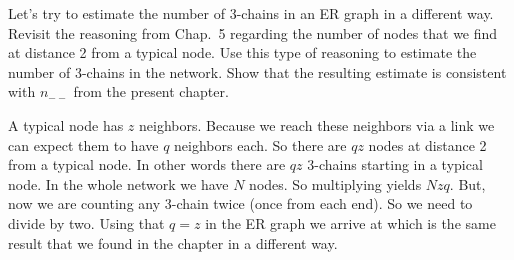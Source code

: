Let's try to estimate the number of 3-chains in an ER graph in a different way. Revisit the reasoning from Chap.~5 regarding the number of nodes that we find at distance 2 from a typical node. 
Use this type of reasoning to estimate the number of 3-chains in the network. Show that the resulting estimate is consistent with $n_{--}$ from the present chapter.   

\solution
A typical node has $z$ neighbors. Because we reach these neighbors via a link we can expect them to have $q$ neighbors each. So there are $qz$ nodes at distance 2 from a typical node. In other words there are $qz$ 3-chains starting in a typical node. In the whole network we have $N$ nodes. So multiplying yields $Nzq$. But, now we are counting any 3-chain twice (once from each end). So we need to divide by two. Using that $q=z$ in the ER graph we arrive at  
which is the same result that we found in the chapter in a different way.